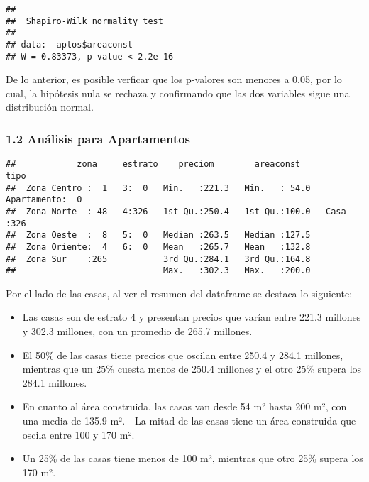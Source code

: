 \documentclass[
]{article}
\newenvironment{Shaded}{\begin{snugshade}}{\end{snugshade}}
\newcommand{\FunctionTok}[1]{\textcolor[rgb]{0.13,0.29,0.53}{\textbf{#1}}}
\newcommand{\NormalTok}[1]{#1}
\newcommand{\OtherTok}[1]{\textcolor[rgb]{0.56,0.35,0.01}{#1}}
\newcommand{\SpecialCharTok}[1]{\textcolor[rgb]{0.81,0.36,0.00}{\textbf{#1}}}
\newcommand{\StringTok}[1]{\textcolor[rgb]{0.31,0.60,0.02}{#1}}
\begin{document}
\begin{Shaded}
\end{Shaded}

\begin{verbatim}
## 
##  Shapiro-Wilk normality test
## 
## data:  aptos$areaconst
## W = 0.83373, p-value < 2.2e-16
\end{verbatim}

De lo anterior, es posible verficar que los p-valores son menores a
0.05, por lo cual, la hipótesis nula se rechaza y confirmando que las
dos variables sigue una distribución normal.

\subsubsection{1.2 Análisis para
Apartamentos}\label{anuxe1lisis-para-apartamentos-1}

\begin{Shaded}
\end{Shaded}

\begin{verbatim}
##            zona     estrato    preciom        areaconst              tipo    
##  Zona Centro :  1   3:  0   Min.   :221.3   Min.   : 54.0   Apartamento:  0  
##  Zona Norte  : 48   4:326   1st Qu.:250.4   1st Qu.:100.0   Casa       :326  
##  Zona Oeste  :  8   5:  0   Median :263.5   Median :127.5                    
##  Zona Oriente:  4   6:  0   Mean   :265.7   Mean   :132.8                    
##  Zona Sur    :265           3rd Qu.:284.1   3rd Qu.:164.8                    
##                             Max.   :302.3   Max.   :200.0
\end{verbatim}

Por el lado de las casas, al ver el resumen del dataframe se destaca lo
siguiente:

\begin{itemize}
\item
  Las casas son de estrato 4 y presentan precios que varían entre 221.3
  millones y 302.3 millones, con un promedio de 265.7 millones.
\item
  El 50\% de las casas tiene precios que oscilan entre 250.4 y 284.1
  millones, mientras que un 25\% cuesta menos de 250.4 millones y el
  otro 25\% supera los 284.1 millones.
\item
  En cuanto al área construida, las casas van desde 54 m² hasta 200 m²,
  con una media de 135.9 m². - La mitad de las casas tiene un área
  construida que oscila entre 100 y 170 m².
\item
  Un 25\% de las casas tiene menos de 100 m², mientras que otro 25\%
  supera los 170 m².
\end{itemize}
\end{document}
